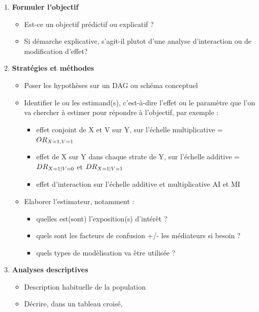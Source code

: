 \documentclass[
]{book}
\providecommand{\tightlist}{%
  \setlength{\itemsep}{0pt}\setlength{\parskip}{0pt}}
\begin{document}
\begin{enumerate}
\def\labelenumi{\arabic{enumi}.}
\tightlist
\item
  \textbf{Formuler l'objectif}

  \begin{itemize}
  \tightlist
  \item
    Est-ce un objectif prédictif ou explicatif ?
  \item
    Si démarche explicative, s'agit-il plutot d'une analyse d'interaction ou de modification d'effet?
  \end{itemize}
\item
  \textbf{Stratégies et méthodes}

  \begin{itemize}
  \tightlist
  \item
    Poser les hypothèses sur un DAG ou schéma conceptuel
  \item
    Identifier le ou les estimand(s), c'est-à-dire l'effet ou le paramètre que l'on va chercher à estimer pour répondre à l'objectif, par exemple :

    \begin{itemize}
    \tightlist
    \item
      effet conjoint de X et V sur Y, sur l'échelle multiplicative = \(\small OR_{X=1,V=1}\)
    \item
      effet de X sur Y dans chaque strate de Y, sur l'échelle additive = \(\small DR_{X=1|V=0}\) et \(\small DR_{X=1|V=1}\)
    \item
      effet d'interaction sur l'échelle additive et multiplicative AI et MI
    \end{itemize}
  \item
    Elaborer l'estimateur, notamment :

    \begin{itemize}
    \tightlist
    \item
      quelles est(sont) l'exposition(s) d'intérêt ?
    \item
      quels sont les facteurs de confusion +/- les médiateurs si besoin ?
    \item
      quels types de modèlisation va être utilisée ?
    \end{itemize}
  \end{itemize}
\item
  \textbf{Analyses descriptives}

  \begin{itemize}
  \tightlist
  \item
    Description habituelle de la population
  \item
    Décrire, dans un tableau croisé,


\end{itemize}
\end{enumerate}
\end{document}
